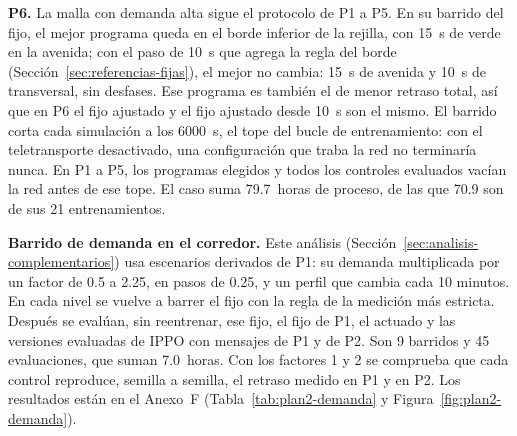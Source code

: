 \noindent\textbf{P6.} La malla con demanda alta sigue el protocolo de
P1 a P5. En su barrido del fijo, el mejor programa queda en el borde
inferior de la rejilla, con 15~s de verde en la avenida; con el paso de
10~s que agrega la regla del borde
(Sección~\ref{sec:referencias-fijas}), el mejor no cambia: 15~s de
avenida y 10~s de transversal, sin desfases. Ese programa es también el
de menor retraso total, así que en P6 el fijo ajustado y el fijo
ajustado desde 10~s son el mismo. El barrido corta cada simulación a
los 6000~s, el tope del bucle de entrenamiento: con el teletransporte
desactivado, una configuración que traba la red no terminaría nunca. En
P1 a P5, los programas elegidos y todos los controles evaluados vacían
la red antes de ese tope. El caso suma 79.7~horas de proceso, de las
que 70.9 son de sus 21 entrenamientos.

\noindent\textbf{Barrido de demanda en el corredor.} Este análisis
(Sección~\ref{sec:analisis-complementarios}) usa escenarios derivados
de P1: su demanda multiplicada por un factor de 0.5 a 2.25, en pasos de
0.25, y un perfil que cambia cada 10 minutos. En cada nivel se vuelve a
barrer el fijo con la regla de la medición más estricta. Después se
evalúan, sin reentrenar, ese fijo, el fijo de P1, el actuado y las
versiones evaluadas de IPPO con mensajes de P1 y de P2. Son 9 barridos
y 45 evaluaciones, que suman 7.0~horas. Con los factores 1 y 2 se
comprueba que cada control reproduce, semilla a semilla, el retraso
medido en P1 y en P2. Los resultados están en el Anexo~F
(Tabla~\ref{tab:plan2-demanda} y Figura~\ref{fig:plan2-demanda}).


